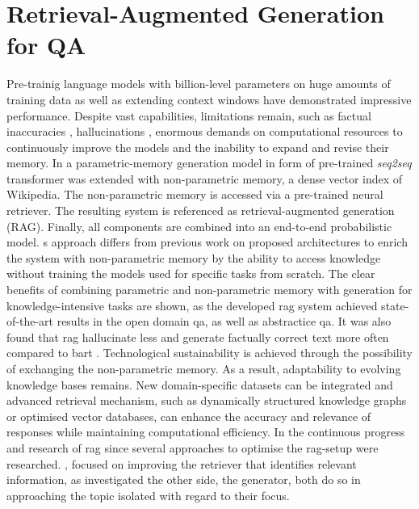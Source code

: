 \section{Retrieval-Augmented Generation for QA}

Pre-trainig language models with billion-level parameters on huge amounts of training data as well as extending context windows have demonstrated impressive performance.
Despite vast capabilities, limitations remain, such as factual inaccuracies \citep{augenstein2023factualitychallengeseralarge}, hallucinations \citep{fan2024surveyragmeetingllms}, enormous demands on computational resources to continuously improve the models and the inability to expand and revise their memory.\citep{lewis2020ragnlp}
In \citet{lewis2020ragnlp} a parametric-memory generation model in form of pre-trained \textit{seq2seq} transformer was extended with non-parametric memory, a dense vector index of Wikipedia.
The non-parametric memory is accessed via a pre-trained neural retriever.
The resulting system is referenced as retrieval-augmented generation (RAG).
Finally, all components are combined into an end-to-end probabilistic model. 
\citet{lewis2020ragnlp}s approach differs from previous work on proposed architectures to enrich the system with non-parametric memory by the ability to access knowledge without training the models used for specific tasks from scratch.
The clear benefits of combining parametric and non-parametric memory with generation for knowledge-intensive tasks are shown, as the developed \ac{rag} system achieved state-of-the-art results in the open domain \ac{ qa}, as well as abstractice \ac{qa}.
It was also found that \ac{rag} hallucinate less and generate factually correct text more often compared to \ac{ bart} \citep{lewis2020ragnlp}.
Technological sustainability is achieved through the possibility of exchanging the non-parametric memory.
As a result, adaptability to evolving knowledge bases remains.
New domain-specific datasets can be integrated and advanced retrieval mechanism, such as dynamically structured knowledge graphs or optimised vector databases, can enhance the accuracy and relevance of responses while maintaining computational efficiency.
%
In the continuous progress and research of \ac{rag} since \citet{lewis2020ragnlp} several approaches to optimise the \ac{rag}-setup were researched.
\citet{izacard2022unsupervised, Karpukhin2020DensePR}, focused on improving the retriever that identifies relevant information, as \citet{Agarwal2024ManyShotIL, liu2024lostmiddle} investigated the other side, the generator, both do so in approaching the topic isolated with regard to their focus.
